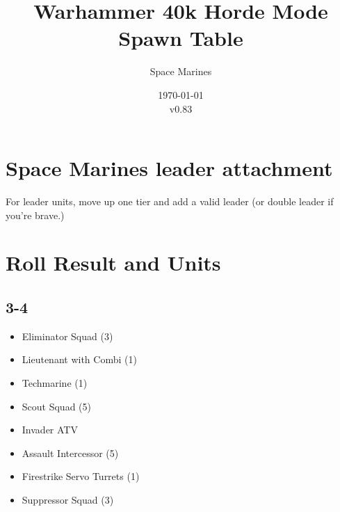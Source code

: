 \documentclass{HordeModeTarot}
\title{Warhammer 40k Horde Mode Spawn Table}
\author{Space Marines}
\date{\today \\v0.83}
\begin{document}
\maketitle

\section*{Space Marines leader attachment}
For leader units, move up one tier and add a valid leader (or double leader if you’re brave.)

\outputUsingSpawnTableBoilerplate

\section*{Roll Result and Units}

\begin{multicols}{2}
\subsection*{3-4}
\begin{itemize}[leftmargin=*]
\item[] Eliminator Squad (3)
\item[] Lieutenant with Combi (1)
\item[] Techmarine (1)
\item[] Scout Squad (5)
\item[] Invader ATV
\item[] Assault Intercessor (5)
\item[] Firestrike Servo Turrets (1)
\item[] Suppressor Squad (3)
\end{itemize}


\end{multicols}
\end{document}
